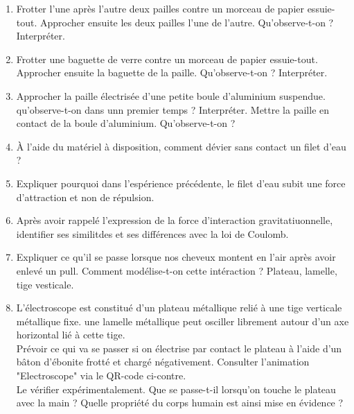 \documentclass[a4paper,12pt,fleqn]{article}%
\begin{document}
\begin{enumerate}
    \item Frotter l'une après l'autre deux pailles contre un morceau de papier essuie-tout. Approcher ensuite les deux pailles l'une de l'autre. Qu'observe-t-on ? Interpréter.
    \item Frotter une baguette de verre contre un morceau de papier essuie-tout. Approcher ensuite la baguette de la paille. Qu'observe-t-on ? Interpréter.
    \item Approcher la paille électrisée d'une petite boule d'aluminium suspendue. qu'observe-t-on dans unn premier temps ? Interpréter. Mettre la paille en contact de la boule d'aluminium. Qu'observe-t-on ?
    \item À l'aide du matériel à disposition, comment dévier sans contact un filet d'eau ?
    \item Expliquer pourquoi dans l'espérience précédente, le filet d'eau subit une force d'attraction et non de répulsion.
    \item Après avoir rappelé l'expression de la force d'interaction gravitatiuonnelle, identifier ses similitdes et ses différences avec la loi de Coulomb.
    \item Expliquer ce qu'il se passe lorsque nos cheveux montent en l'air après avoir enlevé un pull. Comment modélise-t-on cette intéraction ? Plateau, lamelle, tige vesticale.
    \item L'électroscope est constitué d'un plateau métallique relié à une tige verticale métallique fixe. une lamelle métallique peut osciller librement autour d'un axe horizontal lié à cette tige.\\
    Prévoir ce qui va se passer si on électrise par contact le plateau à l'aide d'un bâton d'ébonite frotté et chargé négativement. Consulter l'animation "Electroscope" via le QR-code ci-contre.\\
    Le vérifier expérimentalement. Que se passe-t-il lorsqu'on touche le plateau avec la main ? Quelle propriété du corps humain est ainsi mise en évidence ?
\end{enumerate}
\end{document}
